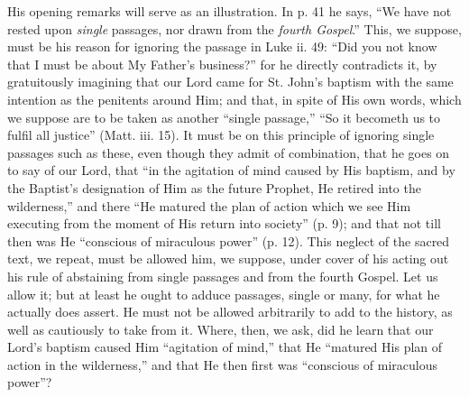 His opening remarks will serve as an
illustration. In p. 41 he says, ``We have not rested upon \emph{single}
passages, nor drawn from the \emph{fourth Gospel}.'' This, we suppose,
must be his reason for ignoring the passage in Luke ii. 49: ``Did you
not know that I must be about My Father's business?'' for he directly
contradicts it, by gratuitously imagining that our Lord came for
St. John's baptism with the same intention as the penitents around
Him; and that, in spite of His own words, which we suppose are to be
taken as another ``single passage,'' ``So it becometh us to fulfil
all justice'' (Matt. iii. 15). It must be on this principle of ignoring
single passages such as these, even though they admit of combination,
that he goes on to say of our Lord, that ``in the agitation of mind
caused by His baptism, and by the Baptist's designation of Him as the
future Prophet, He retired into the wilderness,'' and there ``He matured
the plan of action which we see Him executing from the moment of His
return into society'' (p. 9); and that not till then was He ``conscious
of miraculous power'' (p. 12). This neglect of the sacred text, we
repeat, must be allowed him, we suppose, under cover of his acting out
his rule of abstaining from single passages and from the fourth
Gospel. Let us allow it; but at least he ought to adduce passages,
single or many, for what he actually does assert. He must not be
allowed arbitrarily to add to the history, as well as cautiously to
take from it. Where, then, we ask, did he learn that our Lord's
baptism caused Him ``agitation of mind,'' that He ``matured His plan of
action in the wilderness,'' and that He then first was ``conscious of
miraculous power''?

